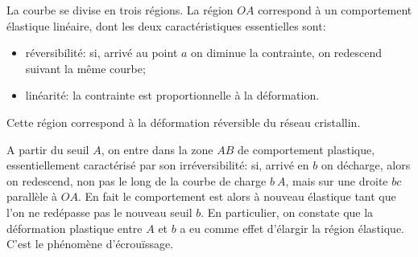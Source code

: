 La courbe se divise en trois régions.
La région $OA$ correspond à un comportement élastique linéaire, dont les deux caractéristiques essentielles sont:
\begin{itemize}
    \item réversibilité: si, arrivé au point $a$ on diminue la contrainte, on redescend suivant la même courbe;
    \item linéarité: la contrainte est proportionnelle à la déformation. 
\end{itemize}
Cette région correspond à la déformation réversible du réseau cristallin. 

A partir du seuil $A$, on entre dans la zone $AB$ de comportement plastique, essentiellement caractérisé par son irréversibilité: si, arrivé en $b$ on décharge, alors on redescend, non pas le long de la courbe de charge $b\ A$, mais sur une droite $bc$ parallèle à $OA$.
En fait le comportement est alors à nouveau élastique tant que l'on ne redépasse pas le nouveau seuil $b$.
En particulier, on constate que la déformation plastique entre $A$ et $b$ a eu comme effet d'élargir la région élastique.
C'est le phénomène d'écrouïssage.

